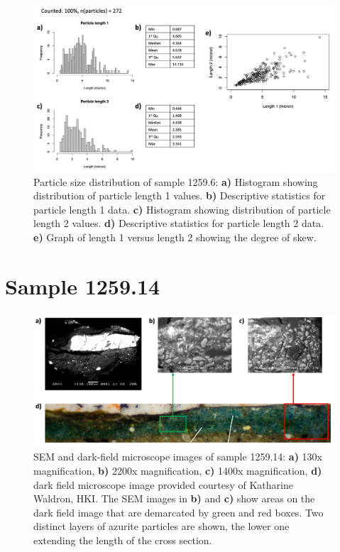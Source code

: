 \begin{figure}[H]
\centering
  \includegraphics[width=0.8\linewidth]{1259.6_partsize}
\caption[Particle size distribution, sample 1259.6.]{Particle size distribution of sample 1259.6: \textbf{a)} Histogram showing distribution of particle length 1 values. \textbf{b)} Descriptive statistics for particle length 1 data. \textbf{c)} Histogram showing distribution of particle length 2 values. \textbf{d)} Descriptive statistics for particle length 2 data. \textbf{e)} Graph of length 1 versus length 2 showing the degree of skew.}
\label{fig:1259.6_partsize}
\end{figure}




\section{Sample 1259.14}

\begin{figure}[H]
  \centering
  \includegraphics[width=0.8\linewidth]{1259.14_imgs}
\caption[SEM and dark-field microscope images of sample 1259.14.]{SEM and dark-field microscope images of sample 1259.14: \textbf{a)} 130x magnification, \textbf{b)} 2200x magnification, \textbf{c)} 1400x magnification, \textbf{d)} dark field microscope image provided courtesy of Katharine Waldron, HKI. The SEM images in \textbf{b)} and \textbf{c)} show areas on the dark field image that are demarcated by green and red boxes. Two distinct layers of azurite particles are shown, the lower one extending the length of the cross section.}
\label{fig:1259.14_imgs}
\end{figure}

